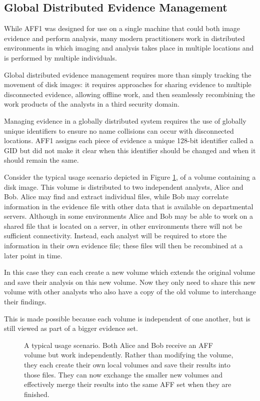 \documentclass[10pt, conference]{IEEEtran}
\begin{document}
\subsection{Global Distributed Evidence Management}
While AFF1 was designed for use on a single machine that could both
image evidence and perform analysis, many modern practitioners work in
distributed environments in which imaging and analysis takes place in
multiple locations and is performed by multiple individuals. 

Global distributed evidence management requires more than simply
tracking the movement of disk images: it requires approaches for
sharing evidence to multiple disconnected evidence, allowing offline
work, and then seamlessly recombining the work products of the
analysts in a third security domain.

Managing evidence in a globally distributed system requires the use of
globally unique identifiers to ensure no name collisions can occur
with disconnected locations. AFF1 assigns each piece of evidence a
unique 128-bit identifier called a GID but did not make it clear when
this identifier should be changed and when it should remain the same.

Consider the typical usage scenario depicted in Figure \ref{usage}, of
a volume containing a disk image. This volume is distributed to two
independent analysts, Alice and Bob. Alice may find and extract
individual files, while Bob may correlate information in the evidence
file with other data that is available on departmental
servers. Although in some environments Alice and Bob may be able to
work on a shared file that is located on a server, in other
environments there will not be sufficient connectivity. Instead, each
analyst will be required to store the information in their own
evidence file; these files will then be recombined at a later point in
time.

In this case they can each create a new volume which extends the
original volume and save their analysis on this new volume. Now they
only need to share this new volume with other analysts who also have a
copy of the old volume to interchange their findings.

This is made possible because each volume is independent of one
another, but is still viewed as part of a bigger evidence set.

\begin{figure}[tb]
  \begin{center}
  \mbox{\columnwidth {}}
  \caption{A typical usage scenario. Both Alice and Bob receive an AFF
  volume but work independently. Rather than modifying the volume,
  they each create their own local volumes and save their results into
  those files. They can now exchange the smaller new volumes and
  effectively merge their results into the same AFF set when they are finished.}
  \label{usage}
  \end{center}
\end{figure}
\end{document}
